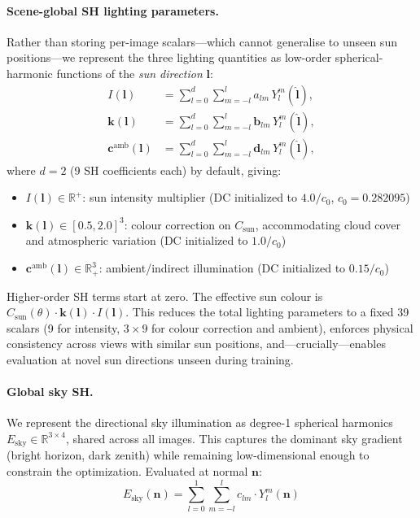 \documentclass[conference]{IEEEtran}
\begin{document}
\paragraph{Scene-global SH lighting parameters.}
Rather than storing per-image scalars---which cannot generalise to unseen sun positions---we represent the three lighting quantities as low-order spherical-harmonic functions of the \emph{sun direction} $\mathbf{l}$:
\begin{align}
    I(\mathbf{l})                       & = \sum_{l=0}^{d}\sum_{m=-l}^{l} a_{lm}\, Y_l^m(\hat{\mathbf{l}}), \label{eq:scene_sh_int}          \\
    \mathbf{k}(\mathbf{l})              & = \sum_{l=0}^{d}\sum_{m=-l}^{l} \mathbf{b}_{lm}\, Y_l^m(\hat{\mathbf{l}}), \label{eq:scene_sh_col} \\
    \mathbf{c}^{\text{amb}}(\mathbf{l}) & = \sum_{l=0}^{d}\sum_{m=-l}^{l} \mathbf{d}_{lm}\, Y_l^m(\hat{\mathbf{l}}), \label{eq:scene_sh_amb}
\end{align}
where $d = 2$ (9 SH coefficients each) by default, giving:
\begin{itemize}
    \item $I(\mathbf{l}) \in \mathbb{R}^+$: sun intensity multiplier (DC initialized to $4.0 / c_0$, $c_0 = 0.282095$)
    \item $\mathbf{k}(\mathbf{l}) \in [0.5, 2.0]^3$: colour correction on $C_{\text{sun}}$, accommodating cloud cover and atmospheric variation (DC initialized to $1.0 / c_0$)
    \item $\mathbf{c}^{\text{amb}}(\mathbf{l}) \in \mathbb{R}^{3}_+$: ambient/indirect illumination (DC initialized to $0.15 / c_0$)
\end{itemize}
Higher-order SH terms start at zero.
The effective sun colour is $C_{\text{sun}}(\theta) \cdot \mathbf{k}(\mathbf{l}) \cdot I(\mathbf{l})$.
This reduces the total lighting parameters to a fixed 39 scalars (9 for intensity, $3{\times}9$ for colour correction and ambient), enforces physical consistency across views with similar sun positions, and---crucially---enables evaluation at novel sun directions unseen during training.

\paragraph{Global sky SH.}
We represent the directional sky illumination as degree-1 spherical harmonics $E_{\text{sky}} \in \mathbb{R}^{3 \times 4}$, shared across all images.
This captures the dominant sky gradient (bright horizon, dark zenith) while remaining low-dimensional enough to constrain the optimization.
Evaluated at normal $\mathbf{n}$:
\begin{equation}
    E_{\text{sky}}(\mathbf{n}) = \sum_{l=0}^{1}\sum_{m=-l}^{l} c_{lm} \cdot Y_l^m(\mathbf{n})
    \label{eq:sky_sh}
\end{equation}
\end{document}
